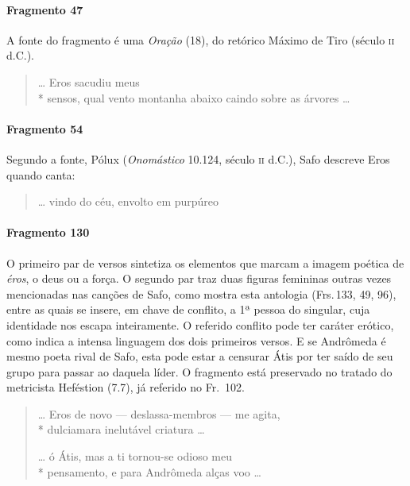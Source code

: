 \paragraph{Fragmento 47}

{\small A fonte do fragmento é uma \textit{Oração} (18), do retórico Máximo de Tiro (século
\textsc{ii} d.C.).}

\begin{verse}
\ldots{} Eros sacudiu meus\\*
sensos, qual vento montanha abaixo caindo sobre as árvores \ldots{}
\end{verse}

\paragraph{Fragmento 54}

{\small Segundo a fonte, Pólux (\textit{Onomástico} 10.124, século \textsc{ii} d.C.), Safo descreve Eros
quando canta:}

\begin{verse}
\ldots{} vindo do céu, envolto em purpúreo 
\end{verse}

\paragraph{Fragmento 130}

{\small O primeiro par de versos sintetiza os elementos que marcam a imagem poética de
\textit{éros}, o deus ou a força. O segundo par traz duas figuras femininas
outras vezes mencionadas nas canções de Safo, como mostra esta antologia (Frs.\,133, 49, 96), entre
as quais se insere, em chave de conflito, a 1ª pessoa do singular, cuja
identidade nos escapa inteiramente. O referido conflito pode ter caráter
erótico, como indica a intensa linguagem dos dois primeiros versos. E se Andrômeda é mesmo poeta rival de Safo, esta pode estar a censurar Átis por ter saído de seu grupo para passar ao daquela líder. O fragmento está preservado no tratado do metricista Heféstion (7.7), já
referido no Fr.~102.}

\begin{verse}
\ldots{} Eros de novo --- deslassa-membros --- me agita,\\*
dulciamara inelutável criatura \ldots{}

\ast\quad\ast\quad\ast

\ldots{} ó Átis, mas a ti tornou-se odioso meu\\*
pensamento, e para Andrômeda alças voo \ldots{}
\end{verse}

